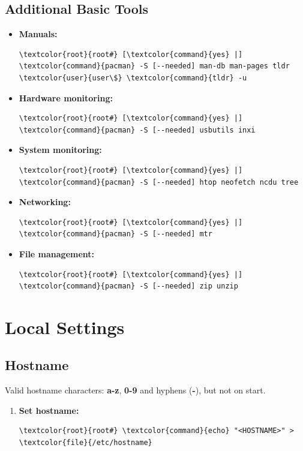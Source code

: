 \documentclass[10pt, a4paper, onecolumn, oneside, titlepage, openany]{book}
\begin{document}
\section{Additional Basic Tools}
\begin{itemize}
    \item \textbf{Manuals:}
\begin{Verbatim}[commandchars=\\\{\}]
\textcolor{root}{root#} [\textcolor{command}{yes} |] \textcolor{command}{pacman} -S [--needed] man-db man-pages tldr
\textcolor{user}{user\$} \textcolor{command}{tldr} -u
\end{Verbatim}    
    \item \textbf{Hardware monitoring:}
\begin{Verbatim}[commandchars=\\\{\}]
\textcolor{root}{root#} [\textcolor{command}{yes} |] \textcolor{command}{pacman} -S [--needed] usbutils inxi
\end{Verbatim}
    \item \textbf{System monitoring:}
\begin{Verbatim}[commandchars=\\\{\}]
\textcolor{root}{root#} [\textcolor{command}{yes} |] \textcolor{command}{pacman} -S [--needed] htop neofetch ncdu tree
\end{Verbatim}
    \item \textbf{Networking:}
\begin{Verbatim}[commandchars=\\\{\}]
\textcolor{root}{root#} [\textcolor{command}{yes} |] \textcolor{command}{pacman} -S [--needed] mtr
\end{Verbatim}
    \item \textbf{File management:}
\begin{Verbatim}[commandchars=\\\{\}]
\textcolor{root}{root#} [\textcolor{command}{yes} |] \textcolor{command}{pacman} -S [--needed] zip unzip
\end{Verbatim}
\end{itemize}


\chapter{Local Settings}
\section{Hostname}
Valid hostname characters: \textbf{a-z}, \textbf{0-9} and hyphens (\textbf{-}), but not on start.
\begin{enumerate}
    \item \textbf{Set hostname:}
\begin{Verbatim}[commandchars=\\\{\}]
\textcolor{root}{root#} \textcolor{command}{echo} "<HOSTNAME>" > \textcolor{file}{/etc/hostname}
\end{Verbatim}    
\end{enumerate}
\end{document}
